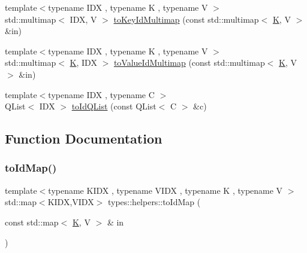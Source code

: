 \begin{DoxyCompactItemize}
\item 
{\footnotesize template$<$typename I\+DX , typename K , typename V $>$ }\\std\+::multimap$<$ I\+DX, V $>$ \mbox{\hyperlink{namespacetypes_1_1helpers_a1e0cfb6c1325b9c0dae5864153fca9b4}{to\+Key\+Id\+Multimap}} (const std\+::multimap$<$ \mbox{\hyperlink{graphbuilder__shp_8cpp_a891e241aa245ae63618f03737efba309}{K}}, V $>$ \&in)
\item 
{\footnotesize template$<$typename I\+DX , typename K , typename V $>$ }\\std\+::multimap$<$ \mbox{\hyperlink{graphbuilder__shp_8cpp_a891e241aa245ae63618f03737efba309}{K}}, I\+DX $>$ \mbox{\hyperlink{namespacetypes_1_1helpers_aac673b6c2aedf9152a8d3f036c605c5c}{to\+Value\+Id\+Multimap}} (const std\+::multimap$<$ \mbox{\hyperlink{graphbuilder__shp_8cpp_a891e241aa245ae63618f03737efba309}{K}}, V $>$ \&in)
\item 
{\footnotesize template$<$typename I\+DX , typename C $>$ }\\Q\+List$<$ I\+DX $>$ \mbox{\hyperlink{namespacetypes_1_1helpers_a49d3abc4bd09f12eb9d431744841f741}{to\+Id\+Q\+List}} (const Q\+List$<$ C $>$ \&c)
\end{DoxyCompactItemize}


\subsection{Function Documentation}
\mbox{\label{namespacetypes_1_1helpers_a554feb54f03216a27fe91d9a1e336f91}} 
\subsubsection{\texorpdfstring{toIdMap()}{toIdMap()}}
{\footnotesize\ttfamily template$<$typename K\+I\+DX , typename V\+I\+DX , typename K , typename V $>$ \\
std\+::map$<$K\+I\+DX,V\+I\+DX$>$ types\+::helpers\+::to\+Id\+Map (\begin{DoxyParamCaption}\item[{const std\+::map$<$ \mbox{\hyperlink{graphbuilder__shp_8cpp_a891e241aa245ae63618f03737efba309}{K}}, V $>$ \&}]{in }\end{DoxyParamCaption})}

\mbox{\label{namespacetypes_1_1helpers_a722d023fde7eb844213adc519c561b55}} 
